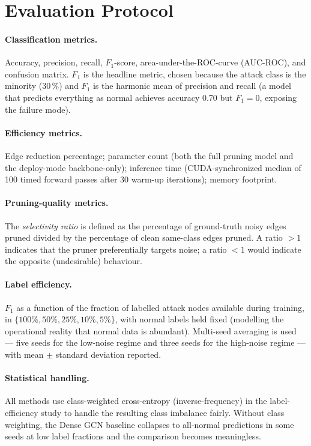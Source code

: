 \documentclass[11pt,a4paper]{report}
\theoremstyle{definition}
\theoremstyle{remark}
\begin{document}
\section{Evaluation Protocol}

\paragraph{Classification metrics.}
Accuracy, precision, recall, $F_1$-score, area-under-the-ROC-curve
(AUC-ROC), and confusion matrix. $F_1$ is the headline metric, chosen
because the attack class is the minority (30\,\%) and $F_1$ is the
harmonic mean of precision and recall (a model that predicts everything
as normal achieves accuracy 0.70 but $F_1=0$, exposing the failure mode).

\paragraph{Efficiency metrics.}
Edge reduction percentage; parameter count (both the full pruning model
and the deploy-mode backbone-only); inference time (CUDA-synchronized
median of 100 timed forward passes after 30 warm-up iterations);
memory footprint.

\paragraph{Pruning-quality metrics.}
The \emph{selectivity ratio} is defined as the percentage of
ground-truth noisy edges pruned divided by the percentage of clean
same-class edges pruned. A ratio $>1$ indicates that the pruner
preferentially targets noise; a ratio $<1$ would indicate the opposite
(undesirable) behaviour.

\paragraph{Label efficiency.}
$F_1$ as a function of the fraction of labelled attack nodes available
during training, in $\{100\%, 50\%, 25\%, 10\%, 5\%\}$, with normal
labels held fixed (modelling the operational reality that normal data
is abundant). Multi-seed averaging is used --- five seeds for the
low-noise regime and three seeds for the high-noise regime --- with
mean $\pm$ standard deviation reported.

\paragraph{Statistical handling.}
All methods use class-weighted cross-entropy (inverse-frequency) in the
label-efficiency study to handle the resulting class imbalance fairly.
Without class weighting, the Dense GCN baseline collapses to all-normal
predictions in some seeds at low label fractions and the comparison
becomes meaningless.
\end{document}
